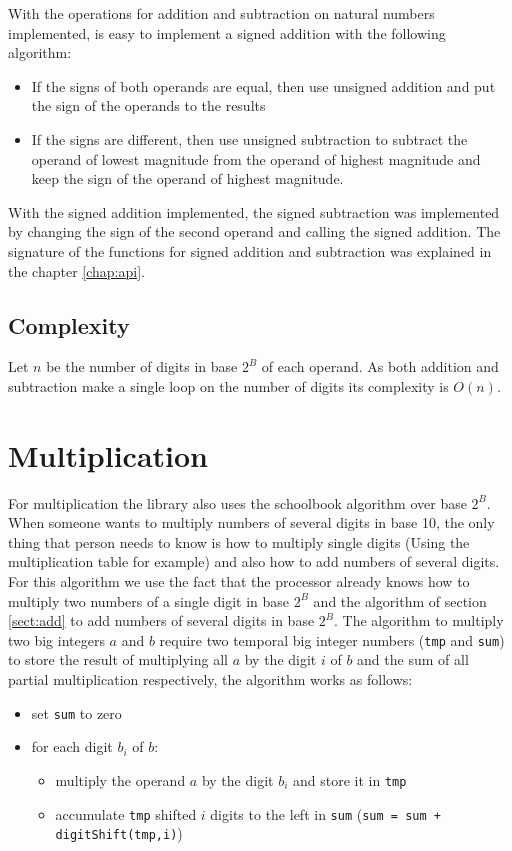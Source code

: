 \documentclass{book}
\begin{document}
With the operations for addition and subtraction on natural numbers implemented, is easy to implement a signed addition with the following algorithm:
\begin{itemize}
\item If the signs of both operands are equal, then use unsigned addition and put the sign of the operands to the results
\item If the signs are different, then use unsigned subtraction to subtract the operand of lowest magnitude from the operand of highest magnitude and keep the sign of the operand of highest magnitude.
\end{itemize}

With the signed addition implemented, the signed subtraction was implemented by changing the sign of the second operand and calling the signed addition. The signature of the functions for signed addition and subtraction was explained in the chapter \ref{chap:api}.

\subsection{Complexity}
Let $n$ be the number of digits in base $2^B$ of each operand. As both addition and subtraction make a single loop on the number of digits its complexity is $O(n)$.

\section{Multiplication}
For multiplication the library also uses the schoolbook algorithm over base $2^B$. When someone wants to multiply numbers of several digits in base 10, the only thing that person needs to know is how to multiply single digits (Using the multiplication table for example) and also how to add numbers of several digits. For this algorithm we use the fact that the processor already knows how to multiply two numbers of a single digit in base $2^B$ and the algorithm of section \ref{sect:add} to add numbers of several digits in base $2^B$. The algorithm to multiply two big integers $a$ and $b$ require two temporal big integer numbers (\verb+tmp+ and \verb+sum+) to store the result of multiplying all $a$ by the digit $i$ of $b$ and the sum of all partial multiplication respectively, the algorithm works as follows:

\begin{itemize}
\item set \verb+sum+ to zero
\item for each digit $b_i$ of $b$:
    \begin{itemize}
    \item multiply the operand $a$ by the digit $b_i$ and store it in \verb+tmp+
    \item accumulate \verb+tmp+ shifted $i$ digits to the left in \verb+sum+ (\verb/sum = sum + digitShift(tmp,i)/)
    \end{itemize}
\end{itemize}
\end{document}
